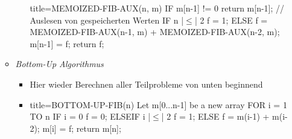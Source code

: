 \documentclass[
    12pt,
    a4paper,
    ngerman,
    color=3b,%
    marginpar=false,
    colorback=false,
    leqno,
]{tudaexercise}
\begin{document}
\begin{itemize}
\begin{itemize}
\begin{itemize}
\begin{ccode}[autogobble,escapeinside=||]{title={MEMOIZED-FIB-AUX(n, m)}}
                            IF m[n-1] != 0
                                return m[n-1];      // Auslesen von gespeicherten Werten
                            IF n |$\leq$| 2
                                f = 1;
                            ELSE
                                f = MEMOIZED-FIB-AUX(n-1, m) + MEMOIZED-FIB-AUX(n-2, m);
                            m[n-1] = f;
                            return f;
                            \end{ccode}
                    \end{itemize}
                \item \textit{Bottom-Up Algorithmus}
                    \begin{itemize}
                        \item Hier wieder Berechnen aller Teilprobleme von unten beginnend
                        \item[]
                            \begin{ccode}[autogobble,escapeinside=||]{title={BOTTOM-UP-FIB(n)}}
                            Let m[0...n-1] be a new array
                            FOR i = 1 TO n
                                IF i = 0
                                    f = 0;
                                ELSEIF i |$\leq$| 2
                                    f = 1;
                                ELSE
                                    f = m(i-1) + m(i-2);
                                m[i] = f;
                            return m[n];
                            \end{ccode}
                    \end{itemize}
            \end{itemize}
    \end{itemize}
\clearpage
\end{document}
